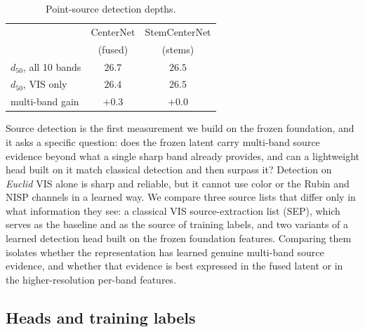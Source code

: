 \documentclass[twocolumn,linenumbers]{aastex701}
\begin{document}
\begin{table}[t]
\vspace{10pt}
\centering
\caption{Point-source detection depths.}
\label{tab:detection_heads}
\begin{tabular}{lcc}
\toprule
                       & CenterNet & StemCenterNet \\
                       & (fused)   & (stems)       \\
\midrule
$d_{50}$, all 10 bands & $26.7$  & $26.5$  \\
$d_{50}$, VIS only     & $26.4$  & $26.5$  \\
multi-band gain        & $+0.3$ & $+0.0$ \\
\bottomrule
\end{tabular}
\end{table}




Source detection is the first measurement we build on the frozen foundation, and it asks a specific question: does the frozen latent carry multi-band source evidence beyond what a single sharp band already provides, and can a lightweight head built on it match classical detection and then surpass it? Detection on \textit{Euclid} VIS alone is sharp and reliable, but it cannot use color or the Rubin and NISP channels in a learned way. We compare three source lists that differ only in what information they see: a classical VIS source-extraction list (\textsc{SEP}), which serves as the baseline and as the source of training labels, and two variants of a learned detection head built on the frozen foundation features. Comparing them isolates whether the representation has learned genuine multi-band source evidence, and whether that evidence is best expressed in the fused latent or in the higher-resolution per-band features.

\subsection{Heads and training labels}
\end{document}

